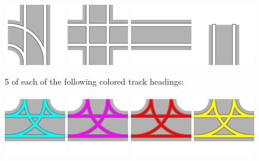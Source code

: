 \documentclass[12pt, letterpaper]{article}
\begin{document}
\includegraphics[width=0.20\textwidth]{Track_57.png}
\includegraphics[width=0.20\textwidth]{Track_60.png}
\includegraphics[width=0.20\textwidth]{Track_62.png}
\includegraphics[width=0.20\textwidth]{Track_end.png}

5 of each of the following colored track headings:

\includegraphics[width=0.20\textwidth]{BlueHeading.png}
\includegraphics[width=0.20\textwidth]{PurpleHeading.png}
\includegraphics[width=0.20\textwidth]{RedHeading.png}
\includegraphics[width=0.20\textwidth]{YellowHeading.png}
\end{document}
